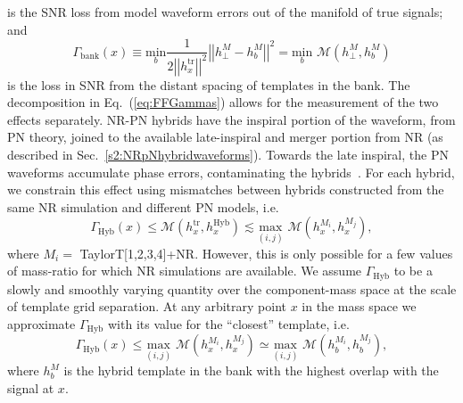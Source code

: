 \documentclass[aps,
prd,
twocolumn,
superscriptaddress,
lengthcheck,showpacs,letterpaper,nofootinbib,
floatfix]{revtex4-1}
\newcommand{\M}{\mathit{M}}
\newcommand{\bnk}{\mathrm{bank}}
\newcommand{\mn}{\mathrm{min}}
\newcommand{\mx}{\mathrm{max}}
\newcommand{\tr}{\mathrm{tr}}
\newcommand{\Hyb}{\mathrm{Hyb}}
\newcommand{\leftn}{\left|\left|}
\newcommand{\rightn}{\right|\right|}
\begin{document}
is the SNR loss from model waveform errors out of the manifold of true signals;
and 
\begin{equation}\label{eq:GammaBank}
\Gamma_\bnk(x) \equiv \underset{b}{\mn}\dfrac{1}{2\leftn h^\tr_x\rightn^2}\leftn h^\M_\perp - h^\M_b\rightn^2 = \underset{b}{\mn}\,\,\mathcal{M}(h^\M_\perp,h^\M_b) 
\end{equation}
is the loss in SNR from the distant spacing of templates in the bank.
The decomposition in Eq.~(\ref{eq:FFGammas}) allows for the measurement of the 
two effects separately. 
NR-PN hybrids have the inspiral portion of the waveform, from PN theory, 
joined to the available late-inspiral and merger portion from NR (as described
in Sec.~\ref{s2:NRpNhybridwaveforms}). Towards the late inspiral, the PN
waveforms accumulate phase errors, contaminating the
hybrids~\cite{MacDonald:2011ne,MacDonald:2012mp}. For each hybrid, we constrain
this effect using mismatches between hybrids constructed from the same NR 
simulation and different PN models, i.e.
\begin{equation}
 \Gamma_\Hyb(x) \leq \mathcal{M}(h^\tr_x,h^\Hyb_x) \lesssim \underset{(i,j)}{\mx}\,\,\mathcal{M}(h^{\M_i}_x,h^{\M_j}_x),
\end{equation}
where  $\M_i = $ TaylorT[1,2,3,4]+NR.
However, this is only possible for a few values of mass-ratio for which NR
simulations are available. We assume $\Gamma_\Hyb$ to be a slowly and smoothly 
varying quantity over the component-mass space at the scale of template grid
separation. At any arbitrary point $x$ in the mass space we approximate 
$\Gamma_\Hyb$ with its value for the ``closest'' template, i.e.
\begin{equation}\label{eq:GammaHybfinal}
 \Gamma_\Hyb(x) \leq \underset{(i,j)}{\mx}\,\,\mathcal{M}(h^{\M_i}_x,h^{\M_j}_x) \simeq \underset{(i,j)}{\mx}\,\,\mathcal{M}(h^{\M_i}_b,h^{\M_j}_b),
\end{equation}
where $h^\M_b$ is the hybrid template in the bank with the highest overlap with 
the signal at $x$. 
\end{document}
